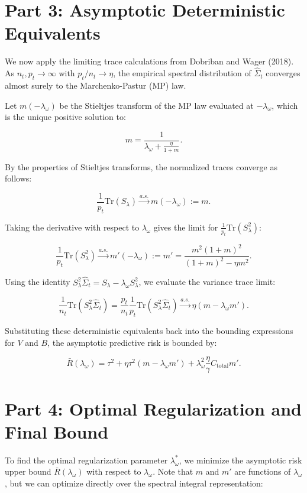 \documentclass{article}
\begin{document}
\section*{Part 3: Asymptotic Deterministic Equivalents}

We now apply the limiting trace calculations from Dobriban and Wager (2018). As $n_t, p_t \to \infty$ with $p_t/n_t \to \eta$, the empirical spectral distribution of $\hat{\Sigma}_t$ converges almost surely to the Marchenko-Pastur (MP) law.

Let $m(-\lambda_\omega)$ be the Stieltjes transform of the MP law evaluated at $-\lambda_\omega$, which is the unique positive solution to:

\[
m = \frac{1}{\lambda_\omega + \frac{\eta}{1+m}}.
\]

By the properties of Stieltjes transforms, the normalized traces converge as follows:

\[
\frac{1}{p_t} \mathrm{Tr}(S_\lambda) \xrightarrow{a.s.} m(-\lambda_\omega) := m.
\]

Taking the derivative with respect to $\lambda_\omega$ gives the limit for $\frac{1}{p_t} \mathrm{Tr}(S_\lambda^2)$:

\[
\frac{1}{p_t} \mathrm{Tr}(S_\lambda^2) \xrightarrow{a.s.} m'(-\lambda_\omega) := m' = \frac{m^2(1+m)^2}{(1+m)^2 - \eta m^2}.
\]

Using the identity $S_\lambda^2 \hat{\Sigma}_t = S_\lambda - \lambda_\omega S_\lambda^2$, we evaluate the variance trace limit:

\[
\frac{1}{n_t} \mathrm{Tr}(S_\lambda^2 \hat{\Sigma}_t) = \frac{p_t}{n_t} \frac{1}{p_t} \mathrm{Tr}(S_\lambda^2 \hat{\Sigma}_t) \xrightarrow{a.s.} \eta (m - \lambda_\omega m').
\]

Substituting these deterministic equivalents back into the bounding expressions for $V$ and $B$, the asymptotic predictive risk is bounded by:

\[
\bar{R}(\lambda_\omega) = \tau^2 + \eta \tau^2 (m - \lambda_\omega m') + \lambda_\omega^2 \frac{\eta}{\gamma} C_{\mathrm{total}} m'.
\]

\section*{Part 4: Optimal Regularization and Final Bound}

To find the optimal regularization parameter $\lambda_\omega^*$, we minimize the asymptotic risk upper bound $\bar{R}(\lambda_\omega)$ with respect to $\lambda_\omega$. Note that $m$ and $m'$ are functions of $\lambda_\omega$, but we can optimize directly over the spectral integral representation:
\end{document}
